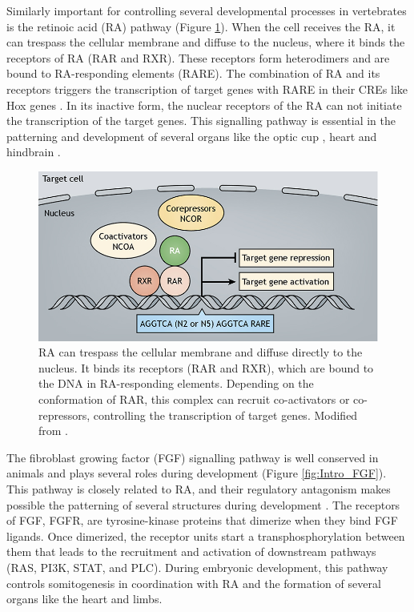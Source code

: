 Similarly important for controlling several developmental processes in vertebrates is the retinoic acid (RA) pathway (Figure \ref{fig:Intro_RA}). When the cell receives the RA, it can trespass the cellular membrane and diffuse to the nucleus, where it binds the receptors of RA (RAR and RXR). These receptors form heterodimers and are bound to RA-responding elements (RARE). The combination of RA and its receptors triggers the transcription of target genes with RARE in their CREs like Hox genes \parencite{cunningham_mechanisms_2015, ghyselinck_retinoic_2019}. In its inactive form, the nuclear receptors of the RA can not initiate the transcription of the target genes. This signalling pathway is essential in  the patterning and development of several organs like the optic cup \parencite{bohnsack_zebrafish_2012}, heart \parencite{keegan_retinoic_2005} and hindbrain \parencite{abu-abed_retinoic_2001}.


\begin{figure}[h!]
\centering
\includegraphics[width=1\textwidth]{Figures/Intro/Intro_RA.png}
\caption[Ra pathway]{RA can trespass the cellular membrane and diffuse directly to the nucleus. It binds its receptors (RAR and RXR), which are bound to the DNA in RA-responding elements. Depending on the conformation of RAR, this complex can recruit co-activators or co-repressors, controlling the transcription of target genes. Modified from \parencite{ghyselinck_retinoic_2019}.}
\label{fig:Intro_RA}
\end{figure} 

The fibroblast growing factor (FGF) signalling pathway is well conserved in animals and plays several roles during development \parencite{dorey_fgf_2010, babonis_phylogenetic_2017} (Figure \ref{fig:Intro_FGF}). This pathway is closely related to RA, and their regulatory antagonism makes possible the patterning of several structures during development \parencite{cunningham_mechanisms_2015}. The receptors of FGF, FGFR, are tyrosine-kinase proteins that dimerize when they bind FGF ligands. Once dimerized, the receptor units start a transphosphorylation between them that leads to the recruitment and activation of downstream pathways (RAS, PI3K, STAT, and PLC). During embryonic development, this pathway controls somitogenesis in coordination with RA \parencite{cunningham_mechanisms_2015} and the formation of several organs like the heart and limbs.


